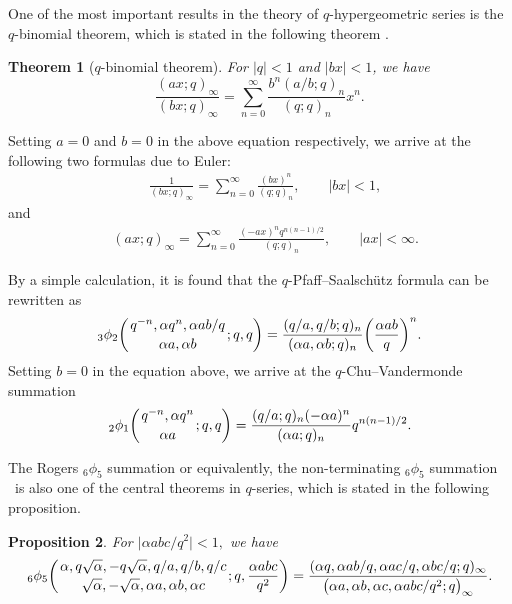 \documentclass[pdftex]{sigma}
\numberwithin{equation}{section}
\newtheorem{Theorem}{Theorem}[section]
\newtheorem{Proposition}[Theorem]{Proposition}
 { \theoremstyle{definition}
\newtheorem{Definition}[Theorem]{Definition}
\newtheorem{Note}[Theorem]{Note}
\newtheorem{Example}[Theorem]{Example}
\newtheorem{Remark}[Theorem]{Remark} }
\begin{document}
One of the most important results in the theory of $q$-hypergeometric series is the $q$-binomial theorem, which is stated in the following theorem \cite[p.~488]{AAR1999}.

\begin{Theorem}[$q$-binomial theorem] %
For $|q|<1$ and $|bx|<1$, we have
	\begin{equation*}
		\frac{(ax; q)_\infty}{(bx; q)_\infty}
		=\sum_{n=0}^\infty \frac{b^n (a/b; q)_n}{(q; q)_n} x^n.
	\end{equation*}
\end{Theorem}
Setting $a=0$ and $b=0$ in the above equation respectively, we arrive at the following two formulas due to Euler:
\begin{align*}%
	&\frac{1}{(bx; q)_\infty}=\sum_{n=0}^\infty \frac{(bx)^n}{(q; q)_n},\qquad |bx|<1,
\end{align*}
and
\begin{align*}
	&(ax; q)_\infty=\sum_{n=0}^\infty \frac{(-ax)^n q^{n(n-1)/2}}{(q; q)_n}, \qquad |ax|<\infty. %
\end{align*}

By a simple calculation, it is found that the $q$-Pfaff--Saalsch\"{u}tz formula \cite[equation~(1.7.2)]{Gas+Rah} can be rewritten as
\begin{equation}\label{qpfaff}
{_3\phi_2}\biggl({{q^{-n}, \alpha q^n, \alpha ab/q}\atop{\alpha a, \alpha b}}; q, q\biggr)=\frac{(q/a, q/b; q)_n}{(\alpha a, \alpha b; q)_n}
\biggl(\frac{\alpha ab}{q}\biggr)^n.
\end{equation}
Setting $b=0$ in the equation above, we arrive at the $q$-Chu--Vandermonde summation \cite[equa\-tion~(1.5.3)]{Gas+Rah}
\begin{equation}\label{qchu-van}
	{_2\phi_1}\biggl({{q^{-n}, \alpha q^n}\atop{\alpha a}}; q, q\biggr)=\frac{(q/a; q)_n (-\alpha a)^n}{(\alpha a; q)_n} q^{n(n-1)/2}.	
\end{equation}

The Rogers $_6\phi_5$ summation or equivalently, the non-terminating $_6\phi_5$ summation \cite[p.~44]{Gas+Rah}~is also one of the central theorems in $q$-series, which is stated in the following proposition.
\begin{Proposition} \label{rogersthm} For $\bigl|\alpha abc/q^2\bigr|<1,$ we have
	\begin{align*}
		{_6 \phi_5} \biggl({{\alpha, q\sqrt{\alpha}, -q\sqrt{\alpha}, q/a, q/b, q/c}
			\atop{\sqrt{\alpha}, -\sqrt{\alpha},\alpha a, \alpha b, \alpha c}}; q, \frac{\alpha abc}{q^2}\biggr)
		=\frac{(\alpha q, \alpha ab/q, \alpha ac/q, \alpha bc/q; q)_\infty}
		{\bigl(\alpha a, \alpha b, \alpha c, \alpha abc/q^2; q\bigr)_\infty}.
	\end{align*}
\end{Proposition}
\end{document}
